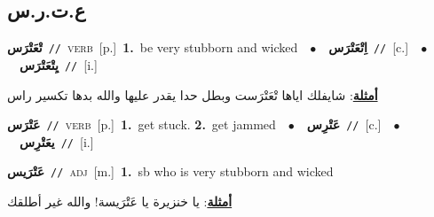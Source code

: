 \documentclass[10pt,a4paper,twoside]{article} %
\begin{document}
\begin{multicols}{2}
\vspace{-3mm}
\subsection*{\color{blue}\foreignlanguage{arabic}{ع.ت.ر.س}\color{blue}{}} 

{\setlength\topsep{0pt}\textbf{\foreignlanguage{arabic}{تْعَتْرَس}}\ {\color{gray}\texttt{//}\color{black}}\ \textsc{verb}\ [p.]\ \textbf{1.}~be very stubborn and wicked\ \ $\bullet$\ \ \setlength\topsep{0pt}\textbf{\foreignlanguage{arabic}{اِتْعَتْرَس}}\ {\color{gray}\texttt{//}\color{black}}\ [c.]\ \ $\bullet$\ \ \setlength\topsep{0pt}\textbf{\foreignlanguage{arabic}{يِتْعَتْرَس}}\ {\color{gray}\texttt{//}\color{black}}\ [i.]\  \begin{flushright}\color{gray}\foreignlanguage{arabic}{\textbf{\underline{\foreignlanguage{arabic}{أمثلة}}}: شايفلك اياها تْعَتْرَست وبطل حدا يقدر عليها والله بدها تكسير راس}\end{flushright}\color{black}} \vspace{2mm}

{\setlength\topsep{0pt}\textbf{\foreignlanguage{arabic}{عَتْرَس}}\ {\color{gray}\texttt{//}\color{black}}\ \textsc{verb}\ [p.]\ \textbf{1.}~get stuck.  \textbf{2.}~get jammed\ \ $\bullet$\ \ \setlength\topsep{0pt}\textbf{\foreignlanguage{arabic}{عَتْرِس}}\ {\color{gray}\texttt{//}\color{black}}\ [c.]\ \ $\bullet$\ \ \setlength\topsep{0pt}\textbf{\foreignlanguage{arabic}{يعَتْرِس}}\ {\color{gray}\texttt{//}\color{black}}\ [i.]\ } \vspace{2mm}

{\setlength\topsep{0pt}\textbf{\foreignlanguage{arabic}{عَتْرَيس}}\ {\color{gray}\texttt{//}\color{black}}\ \textsc{adj}\ [m.]\ \textbf{1.}~sb who is very stubborn and wicked\  \begin{flushright}\color{gray}\foreignlanguage{arabic}{\textbf{\underline{\foreignlanguage{arabic}{أمثلة}}}: يا خنزيرة يا عَتْرَيسة! والله غير أطلقك}\end{flushright}\color{black}} \vspace{2mm}


\end{multicols}
\end{document}
